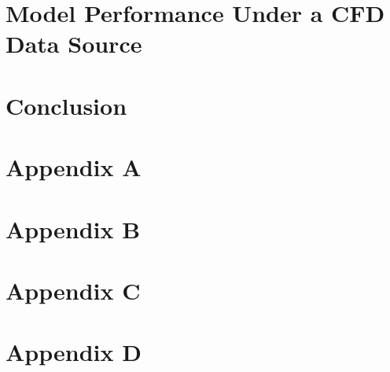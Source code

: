 \documentclass[12pt]{report}
\begin{document}
\chapter{Model Performance Under a CFD Data Source}
\label{chap:fw}


\chapter{Conclusion}
\label{chap:conc}


% 


\chapter{Appendix A}
\label{chap:app_ml}


\chapter{Appendix B}
\label{chap:app_b}


\chapter{Appendix C}
\label{chap:app_c}


\chapter{Appendix D}
\label{chap:app_d}



\end{document}
